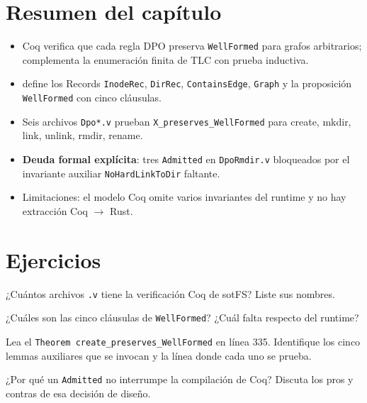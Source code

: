 \section*{Resumen del capítulo}

\begin{itemize}
  \item Coq verifica que cada regla DPO preserva
    \texttt{WellFormed} para grafos arbitrarios; complementa la
    enumeración finita de TLC con prueba inductiva.
  \item {} define los Records \texttt{InodeRec},
    \texttt{DirRec}, \texttt{ContainsEdge}, \texttt{Graph} y la
    proposición \texttt{WellFormed} con cinco cláusulas.
  \item Seis archivos \texttt{Dpo*.v} prueban
    \texttt{X\_preserves\_WellFormed} para create, mkdir, link, unlink,
    rmdir, rename.
  \item \textbf{Deuda formal explícita}: tres \texttt{Admitted} en
    \texttt{DpoRmdir.v} bloqueados por el invariante auxiliar
    \texttt{NoHardLinkToDir} faltante.
  \item Limitaciones: el modelo Coq omite varios invariantes del
    runtime y no hay extracción Coq $\to$ Rust.
\end{itemize}

\section*{Ejercicios}

\begin{ejercicio}[\dificultad{$\star$}]
\label{ej:coq-1}
¿Cuántos archivos \texttt{.v} tiene la verificación Coq de sotFS?
Liste sus nombres.
\end{ejercicio}

\begin{ejercicio}[\dificultad{$\star$}]
\label{ej:coq-2}
¿Cuáles son las cinco cláusulas de \texttt{WellFormed}? ¿Cuál falta
respecto del runtime?
\end{ejercicio}

\begin{ejercicio}[\dificultad{$\star\star$}]
\label{ej:coq-3}
Lea el \texttt{Theorem create\_preserves\_WellFormed} en
 línea 335. Identifique los cinco lemmas
auxiliares que se invocan y la línea donde cada uno se prueba.
\end{ejercicio}

\begin{ejercicio}[\dificultad{$\star\star$}]
\label{ej:coq-4}
¿Por qué un \texttt{Admitted} no interrumpe la compilación de Coq?
Discuta los pros y contras de esa decisión de diseño.
\end{ejercicio}

